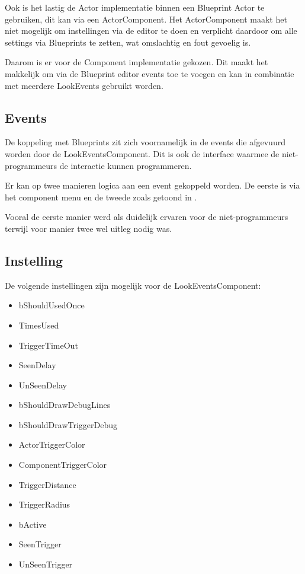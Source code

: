Ook is het lastig de Actor implementatie binnen een Blueprint Actor te gebruiken, dit kan via een ActorComponent. Het ActorComponent maakt het niet mogelijk om instellingen via de editor te doen en verplicht daardoor om alle settings via Blueprints te zetten, wat omslachtig en fout gevoelig is.

Daarom is er voor de Component implementatie gekozen. Dit maakt het makkelijk om via de Blueprint editor events toe te voegen en kan in combinatie met meerdere LookEvents gebruikt worden.

\subsection{Events}
De koppeling met Blueprints zit zich voornamelijk in de events die afgevuurd worden door de LookEventsComponent. Dit is ook de interface waarmee de niet-programmeurs de interactie kunnen programmeren.

Er kan op twee manieren logica aan een event gekoppeld worden. De eerste is via het component menu  en de tweede zoals getoond in .


Vooral de eerste manier werd als duidelijk ervaren voor de niet-programmeurs terwijl voor manier twee wel uitleg nodig was.

\subsection{Instelling}
De volgende instellingen zijn mogelijk voor de LookEventsComponent:

\begin{itemize}
	\item bShouldUsedOnce
	\item TimesUsed
	\item TriggerTimeOut
	\item SeenDelay
	\item UnSeenDelay
	\item bShouldDrawDebugLines
	\item bShouldDrawTriggerDebug
	\item ActorTriggerColor
	\item ComponentTriggerColor
	\item TriggerDistance
	\item TriggerRadius
	\item bActive
	\item SeenTrigger
	\item UnSeenTrigger
\end{itemize}

